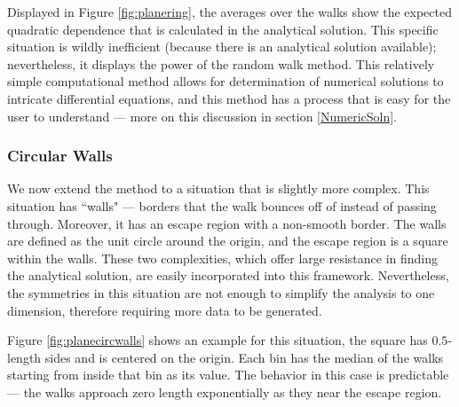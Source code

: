 \documentclass[12pt]{article}
\begin{document}
			Displayed in Figure \ref{fig:planering}, the averages over the walks show the expected quadratic dependence that is calculated in the analytical solution.
			This specific situation is wildly inefficient (because there is an analytical solution available); nevertheless, it displays the power of the random walk method.
			This relatively simple computational method allows for determination of numerical solutions to intricate differential equations, and this method has a process that is easy for the user to understand --- more on this discussion in section \ref{NumericSoln}.
			
		\subsubsection{Circular Walls} \label{circwalls}
			We now extend the method to a situation that is slightly more complex.
			This situation has ``walls" --- borders that the walk bounces off of instead of passing through.
			Moreover, it has an escape region with a non-smooth border.
			The walls are defined as the unit circle around the origin, and the escape region is a square within the walls.
			These two complexities, which offer large resistance in finding the analytical solution, are easily incorporated into this framework.
			Nevertheless, the symmetries in this situation are not enough to simplify the analysis to one dimension, therefore requiring more data to be generated.
			
			Figure \ref{fig:planecircwalls} shows an example for this situation, the square has $0.5$-length sides and is centered on the origin.
			Each bin has the median of the walks starting from inside that bin as its value.
			The behavior in this case is predictable --- the walks approach zero length exponentially as they near the escape region.
			
\end{document}
